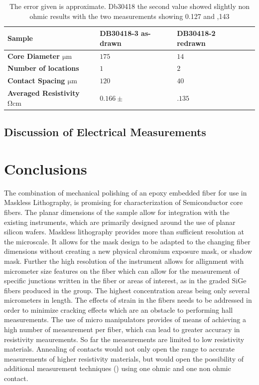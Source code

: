\begin{table}[!h]
\begin{center}
\begin{tabular}{ | l | l | l | l |}
\hline
\textbf{Sample}& DB30418-3  as-drawn& DB30418-2 redrawn \\ \hline
\textbf{Core Diameter $\si{\micro \meter}$}& $ 175$ &$14$\\\hline
\textbf{Number of locations}&$1$&$2$ \\\hline
\textbf{Contact Spacing $\si{\micro\meter}$}&$120$&$40$ \\ \hline
\textbf{Averaged Resistivity $\si{\ohm \cm}$}& $0.166 \pm$ &$.135$ \\\hline
\end{tabular}
\end{center}
\caption{The error given is approximate. Db30418 the second value showed slightly non ohmic results with the two measurements showing 0.127 and ,143}
\label{Tabmb25}
\end{table}

\subsection{Discussion of Electrical Measurements}

\section{Conclusions}
The combination of mechanical polishing of an epoxy embedded fiber for use in Maskless Lithography, is promising for characterization of Semiconductor core fibers. The planar dimensions of the sample allow for integration with the existing instruments, which are primarily designed around the use of planar silicon wafers.  Maskless lithography provides more than sufficient resolution at the microscale. It allows for the mask design to be adapted to the changing fiber dimensions without creating a new physical chromium exposure mask, or shadow mask. Further the high resolution of the instrument allows for allignment with micrometer size features on the fiber which can allow for the measurement of specific junctions written in the fiber or areas of interest, as in the graded SiGe fibers produced in the group. The highest concentration areas being only several micrometers in length. The effects of strain in the fibers needs to be addressed in order to minimize cracking effects which are an obstacle to performing hall measurements. The use of micro manipulators provides of means of achieving a high number of measurement per fiber, which can lead to greater accuracy in resistivity meaurements. So far the measurements are limited to low resistivity materials. Annealing of contacts would not only open the range to accurate measurements of higher resistivity materials, but would open the possibility of additional measurement techniques () using one ohmic and one non ohmic contact. 
